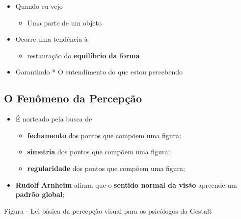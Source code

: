 \documentclass[
]{book}
\providecommand{\tightlist}{%
  \setlength{\itemsep}{0pt}\setlength{\parskip}{0pt}}
\begin{document}
\begin{itemize}
\tightlist
\item
  Quando eu vejo

  \begin{itemize}
  \tightlist
  \item
    Uma parte de um objeto
  \end{itemize}
\item
  Ocorre uma tendência à

  \begin{itemize}
  \tightlist
  \item
    restauração do \textbf{equilíbrio da forma}
  \end{itemize}
\item
  Garantindo
  * O entendimento do que estou percebendo
\end{itemize}

\hypertarget{o-fenuxf4meno-da-percepuxe7uxe3o}{%
\subsection{O Fenômeno da Percepção}\label{o-fenuxf4meno-da-percepuxe7uxe3o}}

\begin{itemize}
\tightlist
\item
  É norteado pela busca de

  \begin{itemize}
  \tightlist
  \item
    \textbf{fechamento} dos pontos que compõem uma figura;
  \item
    \textbf{simetria} dos pontos que compõem uma figura;
  \item
    \textbf{regularidade} dos pontos que compõem uma figura;
  \end{itemize}
\item
  \textbf{Rudolf Arnheim} afirma que o \textbf{sentido normal da visão} apreende um \textbf{padrão global};
\end{itemize}

Figura - Lei básica da percepção visual para os psicólogos da Gestalt
\end{document}
